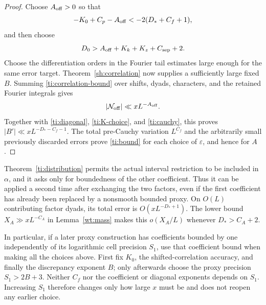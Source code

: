 \begin{proof}
Choose $A_{\rm off}>0$ so that
\[
          -K_0+C_p-A_{\rm off}<-2(D_*+C_f+1),
\]
and then choose
\[
                 D_0>A_{\rm off}+K_k+K_z+C_{\rm sep}+2.
\]
Choose the differentiation orders in the Fourier tail estimates
large enough for the same error target.
Theorem~\ref{sh:correlation} now supplies a sufficiently large fixed $B$.
Summing \eqref{ti:correlation-bound} over shifts, dyads, characters,
and the retained Fourier integrals gives
\[
                       |\mathcal N_{\rm off}|
                                  \ll xL^{-A_{\rm off}}.
\]
Together with \eqref{ti:diagonal}, \eqref{ti:K-choice}, and
\eqref{ti:cauchy}, this proves
$|B'|\ll xL^{-D_*-C_f-1}$. The total pre-Cauchy variation
$L^{C_f}$ and the arbitrarily small previously discarded errors
prove \eqref{ti:bound} for each choice of $\varepsilon$, and hence
for $A$.
\end{proof}

\begin{remark}
\label{ti:proxy-order}
Theorem~\ref{ti:distribution} permits the actual interval restriction
to be included in $\alpha$, and it asks only for boundedness of the
other coefficient. Thus it can be applied a second time after
exchanging the two factors, even if the first coefficient has already
been replaced by a nonsmooth bounded proxy. On $O(L)$ contributing
factor dyads, its total error is $O(xL^{-D_*+1})$. The lower bound
$X_A\gg xL^{-C_A}$ in Lemma~\ref{wt:mass} makes this
$o(X_A/L)$ whenever $D_*>C_A+2$.

In particular, if a later proxy construction has coefficients bounded
by one independently of its logarithmic cell precision $S_1$, use
that coefficient bound when making all the choices above. First fix
$K_0$, the shifted-correlation accuracy, and finally the discrepancy
exponent $B$; only afterwards choose the proxy precision
$S_1>2B+3$. Neither $C_f$ nor the coefficient or diagonal exponents
depends on $S_1$. Increasing $S_1$ therefore changes only how large
$x$ must be and does not reopen any earlier choice.
\end{remark}
